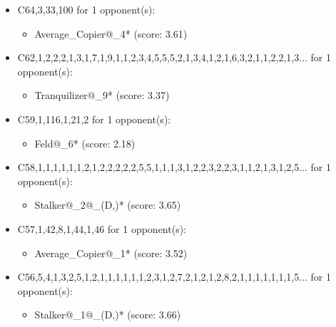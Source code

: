 \begin{appendices}
\begin{itemize}
    \item C64,3,33,100 for 1 opponent(s):
    \begin{multicols}{3}
         \begin{itemize}
            \item Average\_Copier@\_4* (score: 3.61)
        \end{itemize}
     \end{multicols}
     
    \item C62,1,2,2,2,1,3,1,7,1,9,1,1,2,3,4,5,5,5,2,1,3,4,1,2,1,6,3,2,1,1,2,2,1,3... for 1 opponent(s):
    \begin{multicols}{3}
         \begin{itemize}
            \item Tranquilizer@\_9* (score: 3.37)
        \end{itemize}
     \end{multicols}
     
    \item C59,1,116,1,21,2 for 1 opponent(s):
    \begin{multicols}{3}
         \begin{itemize}
            \item Feld@\_6* (score: 2.18)
        \end{itemize}
     \end{multicols}
     
    \item C58,1,1,1,1,1,1,2,1,2,2,2,2,2,5,5,1,1,1,3,1,2,2,3,2,2,3,1,1,2,1,3,1,2,5... for 1 opponent(s):
    \begin{multicols}{3}
         \begin{itemize}
            \item Stalker@\_2@\_(D,)* (score: 3.65)
        \end{itemize}
     \end{multicols}
     
    \item C57,1,42,8,1,44,1,46 for 1 opponent(s):
    \begin{multicols}{3}
         \begin{itemize}
            \item Average\_Copier@\_1* (score: 3.52)
        \end{itemize}
     \end{multicols}
     
    \item C56,5,4,1,3,2,5,1,2,1,1,1,1,1,1,2,3,1,2,7,2,1,2,1,2,8,2,1,1,1,1,1,1,1,5... for 1 opponent(s):
    \begin{multicols}{3}
         \begin{itemize}
            \item Stalker@\_1@\_(D,)* (score: 3.66)
        \end{itemize}
     \end{multicols}
     

\end{itemize}
\end{appendices}
